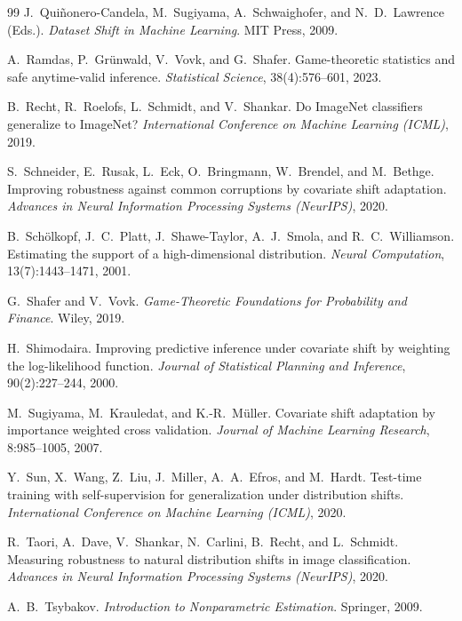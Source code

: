 \begin{thebibliography}{99}
J.~Qui\~nonero-Candela, M.~Sugiyama, A.~Schwaighofer, and N.~D.~Lawrence
(Eds.).
\textit{Dataset Shift in Machine Learning}.
MIT Press, 2009.

A.~Ramdas, P.~Gr\"unwald, V.~Vovk, and G.~Shafer.
Game-theoretic statistics and safe anytime-valid inference.
\textit{Statistical Science}, 38(4):576--601, 2023.

B.~Recht, R.~Roelofs, L.~Schmidt, and V.~Shankar.
Do ImageNet classifiers generalize to ImageNet?
\textit{International Conference on Machine Learning (ICML)}, 2019.

S.~Schneider, E.~Rusak, L.~Eck, O.~Bringmann, W.~Brendel, and
M.~Bethge.
Improving robustness against common corruptions by covariate shift
adaptation.
\textit{Advances in Neural Information Processing Systems (NeurIPS)}, 2020.

B.~Sch\"olkopf, J.~C.~Platt, J.~Shawe-Taylor, A.~J.~Smola, and
R.~C.~Williamson.
Estimating the support of a high-dimensional distribution.
\textit{Neural Computation}, 13(7):1443--1471, 2001.

G.~Shafer and V.~Vovk.
\textit{Game-Theoretic Foundations for Probability and Finance}.
Wiley, 2019.

H.~Shimodaira.
Improving predictive inference under covariate shift by weighting the
log-likelihood function.
\textit{Journal of Statistical Planning and Inference}, 90(2):227--244, 2000.

M.~Sugiyama, M.~Krauledat, and K.-R.~M\"uller.
Covariate shift adaptation by importance weighted cross validation.
\textit{Journal of Machine Learning Research}, 8:985--1005, 2007.

Y.~Sun, X.~Wang, Z.~Liu, J.~Miller, A.~A.~Efros, and M.~Hardt.
Test-time training with self-supervision for generalization under
distribution shifts.
\textit{International Conference on Machine Learning (ICML)}, 2020.

R.~Taori, A.~Dave, V.~Shankar, N.~Carlini, B.~Recht, and L.~Schmidt.
Measuring robustness to natural distribution shifts in image classification.
\textit{Advances in Neural Information Processing Systems (NeurIPS)}, 2020.

A.~B.~Tsybakov.
\textit{Introduction to Nonparametric Estimation}.
Springer, 2009.


\end{thebibliography}
